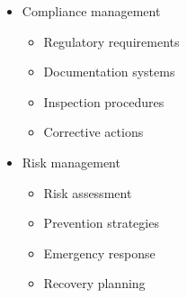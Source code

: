 \begin{itemize}
\begin{itemize}
        \item Compliance management
        \begin{itemize}
            \item Regulatory requirements
            \item Documentation systems
            \item Inspection procedures
            \item Corrective actions
        \end{itemize}
        
        \item Risk management
        \begin{itemize}
            \item Risk assessment
            \item Prevention strategies
            \item Emergency response
            \item Recovery planning
        \end{itemize}
    \end{itemize}
\end{itemize}

